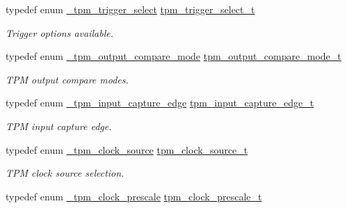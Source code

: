 \begin{DoxyCompactItemize}
typedef enum \mbox{\hyperlink{group__tpm_ga4150281c92685f3d25f13279bdef4b0c}{\+\_\+tpm\+\_\+trigger\+\_\+select}} \mbox{\hyperlink{group__tpm_ga7413575956cb565fba0cc99c39c73bc7}{tpm\+\_\+trigger\+\_\+select\+\_\+t}}
\begin{DoxyCompactList}\small\item\em Trigger options available. \end{DoxyCompactList}\item 
\mbox{\label{group__tpm_gae76bda507d28f3c302f4cdfeee61ba5e}} 
typedef enum \mbox{\hyperlink{group__tpm_ga9a2946f67b4b7513fcd580c48746b22c}{\+\_\+tpm\+\_\+output\+\_\+compare\+\_\+mode}} \mbox{\hyperlink{group__tpm_gae76bda507d28f3c302f4cdfeee61ba5e}{tpm\+\_\+output\+\_\+compare\+\_\+mode\+\_\+t}}
\begin{DoxyCompactList}\small\item\em T\+PM output compare modes. \end{DoxyCompactList}\item 
\mbox{\label{group__tpm_ga5bcbd71358fe69e564786631827f7db1}} 
typedef enum \mbox{\hyperlink{group__tpm_ga16346109e5b2694d2b977a4757754ad8}{\+\_\+tpm\+\_\+input\+\_\+capture\+\_\+edge}} \mbox{\hyperlink{group__tpm_ga5bcbd71358fe69e564786631827f7db1}{tpm\+\_\+input\+\_\+capture\+\_\+edge\+\_\+t}}
\begin{DoxyCompactList}\small\item\em T\+PM input capture edge. \end{DoxyCompactList}\item 
\mbox{\label{group__tpm_gac9f0f29f5ff0e39eea892919dc9b50d8}} 
typedef enum \mbox{\hyperlink{group__tpm_gac99d3a5e259dc4ca8b3d30a813490cda}{\+\_\+tpm\+\_\+clock\+\_\+source}} \mbox{\hyperlink{group__tpm_gac9f0f29f5ff0e39eea892919dc9b50d8}{tpm\+\_\+clock\+\_\+source\+\_\+t}}
\begin{DoxyCompactList}\small\item\em T\+PM clock source selection. \end{DoxyCompactList}\item 
\mbox{\label{group__tpm_gad9e7d333c0c3ad41d6bc740d95004dac}} 
typedef enum \mbox{\hyperlink{group__tpm_gabb93e23246be90fb3bed0cae36875cef}{\+\_\+tpm\+\_\+clock\+\_\+prescale}} \mbox{\hyperlink{group__tpm_gad9e7d333c0c3ad41d6bc740d95004dac}{tpm\+\_\+clock\+\_\+prescale\+\_\+t}}

\end{DoxyCompactItemize}
